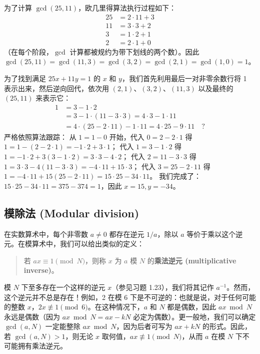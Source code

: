\begin{example}
为了计算 $\gcd(25, 11)$，欧几里得算法执行过程如下：
\begin{align*}
25 &= 2 \cdot 11 + 3 \\
11 &= 3 \cdot 3 + 2 \\
3 &= 1 \cdot 2 + 1 \\
2 &= 2 \cdot 1 + 0
\end{align*}
（在每个阶段，$\gcd$ 计算都被规约为带下划线的两个数）。因此 $\gcd(25, 11) = \gcd(11, 3) = \gcd(3, 2) = \gcd(2, 1) = \gcd(1, 0) = 1$。

为了找到满足 $25x + 11y = 1$ 的 $x$ 和 $y$，我们首先利用最后一对非零余数行将 1 表示出来，然后逆向回代，依次用 $(2, 1)$、$(3, 2)$、$(11, 3)$ 以及最终的 $(25, 11)$ 来表示它：
\begin{align*}
1 &= 3 - 1 \cdot 2 \\
&= 3 - 1 \cdot (11 - 3 \cdot 3) = 4 \cdot 3 - 1 \cdot 11 \\
&= 4 \cdot (25 - 2 \cdot 11) - 1 \cdot 11 = 4 \cdot 25 - 9 \cdot 11 \quad \text{?}
\end{align*}
严格依照算法跟踪：
从 $1 = 1 - 0$ 开始，代入 $0 = 2 - 2 \cdot 1$ 得 $1 = 1 - (2 - 2 \cdot 1) = -1 \cdot 2 + 3 \cdot 1$；
代入 $1 = 3 - 1 \cdot 2$ 得 $1 = -1 \cdot 2 + 3(3 - 1 \cdot 2) = 3 \cdot 3 - 4 \cdot 2$；
代入 $2 = 11 - 3 \cdot 3$ 得 $1 = 3 \cdot 3 - 4(11 - 3 \cdot 3) = -4 \cdot 11 + 15 \cdot 3$；
代入 $3 = 25 - 2 \cdot 11$ 得 $1 = -4 \cdot 11 + 15(25 - 2 \cdot 11) = 15 \cdot 25 - 34 \cdot 11$。
我们完成了：$15 \cdot 25 - 34 \cdot 11 = 375 - 374 = 1$，因此 $x = 15, y = -34$。
\end{example}

\subsection{模除法 (Modular division)}
在实数算术中，每个非零数 $a \ne 0$ 都存在逆元 $1/a$，除以 $a$ 等价于乘以这个逆元。在模算术中，我们可以给出类似的定义：

\begin{quote}
若 $ax \equiv 1 \pmod N$，则称 $x$ 为 $a$ 模 $N$ 的\textbf{乘法逆元 (multiplicative inverse)}。
\end{quote}

模 $N$ 下至多存在一个这样的逆元 $x$（参见习题 1.23），我们将其记作 $a^{-1}$。然而，这个逆元并不总是存在！例如，2 在模 6 下是不可逆的：也就是说，对于任何可能的整数 $x$，$2x \not\equiv 1 \pmod 6$。在这种情况下，$a$ 和 $N$ 都是偶数，因此 $ax \bmod N$ 永远是偶数（因为 $ax \bmod N = ax - kN$ 必定为偶数）。更一般地，我们可以确定 $\gcd(a, N)$ 一定能整除 $ax \bmod N$，因为后者可写为 $ax + kN$ 的形式。因此，若 $\gcd(a, N) > 1$，则无论 $x$ 取何值，$ax \not\equiv 1 \pmod N$，从而 $a$ 在模 $N$ 下不可能拥有乘法逆元。

